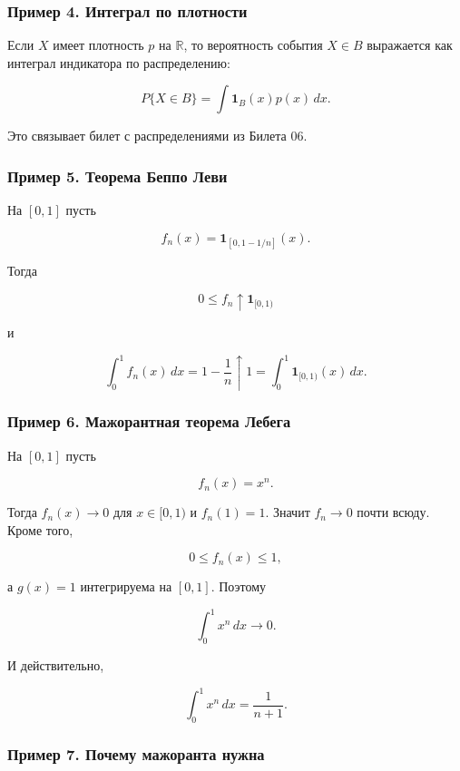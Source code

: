 \documentclass[
  11pt,
  a4paper,
]{article}
\begin{document}
\subsubsection{Пример 4. Интеграл по
плотности}\label{ux43fux440ux438ux43cux435ux440-4.-ux438ux43dux442ux435ux433ux440ux430ux43b-ux43fux43e-ux43fux43bux43eux442ux43dux43eux441ux442ux438}

Если \(X\) имеет плотность \(p\) на \(\mathbb R\), то вероятность
события \(X\in B\) выражается как интеграл индикатора по распределению:

\[
P\{X\in B\}=\int \mathbf 1_B(x)p(x)\,dx.
\]

Это связывает билет с распределениями из Билета 06.

\subsubsection{Пример 5. Теорема Беппо
Леви}\label{ux43fux440ux438ux43cux435ux440-5.-ux442ux435ux43eux440ux435ux43cux430-ux431ux435ux43fux43fux43e-ux43bux435ux432ux438}

На \([0,1]\) пусть

\[
f_n(x)=\mathbf 1_{[0,1-1/n]}(x).
\]

Тогда

\[
0\le f_n\uparrow \mathbf 1_{[0,1)}
\]

и

\[
\int_0^1 f_n(x)\,dx=1-\frac1n
\uparrow
1
=
\int_0^1 \mathbf 1_{[0,1)}(x)\,dx.
\]

\subsubsection{Пример 6. Мажорантная теорема
Лебега}\label{ux43fux440ux438ux43cux435ux440-6.-ux43cux430ux436ux43eux440ux430ux43dux442ux43dux430ux44f-ux442ux435ux43eux440ux435ux43cux430-ux43bux435ux431ux435ux433ux430}

На \([0,1]\) пусть

\[
f_n(x)=x^n.
\]

Тогда \(f_n(x)\to0\) для \(x\in[0,1)\) и \(f_n(1)=1\). Значит
\(f_n\to0\) почти всюду. Кроме того,

\[
0\le f_n(x)\le1,
\]

а \(g(x)=1\) интегрируема на \([0,1]\). Поэтому

\[
\int_0^1 x^n\,dx\to0.
\]

И действительно,

\[
\int_0^1 x^n\,dx=\frac1{n+1}.
\]

\subsubsection{Пример 7. Почему мажоранта
нужна}\label{ux43fux440ux438ux43cux435ux440-7.-ux43fux43eux447ux435ux43cux443-ux43cux430ux436ux43eux440ux430ux43dux442ux430-ux43dux443ux436ux43dux430}
\end{document}
